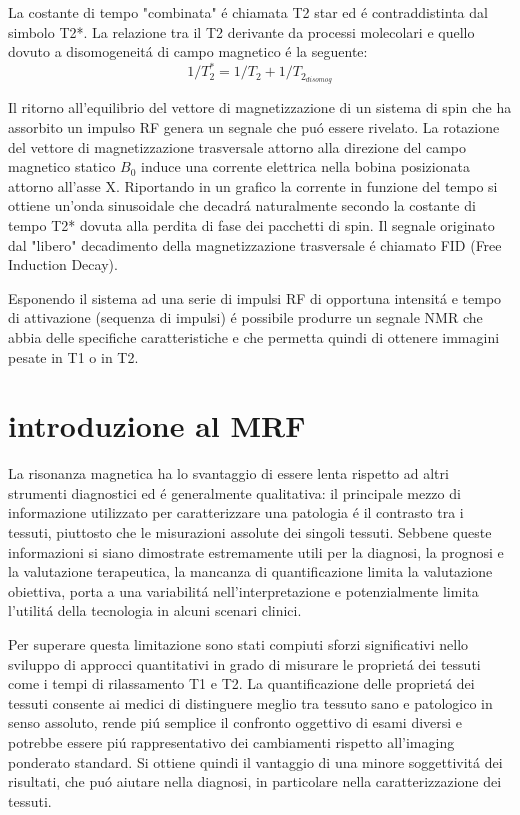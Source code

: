 \documentclass[a4paper,12pt]{report}
\begin{document}
 La costante di tempo "combinata" \'e chiamata T2 star ed \'e contraddistinta dal simbolo T2*. La relazione tra il T2 derivante da processi molecolari e quello dovuto a disomogeneit\'a di campo magnetico \'e la seguente:
\begin{equation}
 1 / T_2^* = 1 / T_2 + 1 / T_{2_{disomog}}
\end{equation}

Il ritorno all'equilibrio del vettore di magnetizzazione di un sistema di spin che ha assorbito un impulso RF genera un segnale che pu\'o essere rivelato.
La rotazione del vettore di magnetizzazione trasversale attorno alla direzione del campo magnetico statico $B_0$ induce una corrente elettrica nella bobina posizionata attorno all'asse X. 
Riportando in un grafico la corrente in funzione del tempo si ottiene un'onda sinusoidale che decadr\'a naturalmente secondo la costante di tempo T2* dovuta alla perdita di fase dei pacchetti di spin. 
Il segnale originato dal "libero" decadimento della magnetizzazione trasversale \'e chiamato FID (Free Induction Decay).

Esponendo il sistema ad una serie di impulsi RF di opportuna intensit\'a e tempo di attivazione (sequenza di impulsi) \'e possibile produrre un segnale NMR che abbia delle specifiche caratteristiche e che permetta quindi di ottenere immagini pesate in T1 o in T2.
 
 \section{introduzione al MRF}
 
 La risonanza magnetica ha lo svantaggio di essere lenta rispetto ad altri strumenti diagnostici ed \'e generalmente qualitativa: il principale mezzo di informazione utilizzato per caratterizzare una patologia \'e il contrasto tra i tessuti, piuttosto che le misurazioni assolute dei singoli tessuti. 
 Sebbene queste informazioni si siano dimostrate estremamente utili per la diagnosi, la prognosi e la valutazione terapeutica, la mancanza di quantificazione limita la valutazione obiettiva, porta a una variabilit\'a nell'interpretazione e potenzialmente limita l'utilit\'a della tecnologia in alcuni scenari clinici. 
 
 Per superare questa limitazione sono stati compiuti sforzi significativi nello sviluppo di approcci quantitativi in grado di misurare le propriet\'a dei tessuti come i tempi di rilassamento T1 e T2. 
 La quantificazione delle propriet\'a dei tessuti consente ai medici di distinguere meglio tra tessuto sano e patologico in senso assoluto, rende pi\'u semplice il confronto oggettivo di esami diversi e potrebbe essere pi\'u rappresentativo dei cambiamenti rispetto all'imaging ponderato standard. 
 Si ottiene quindi il vantaggio di una minore soggettivit\'a dei risultati, che pu\'o aiutare nella diagnosi, in particolare nella caratterizzazione dei tessuti.  
 
\end{document}
